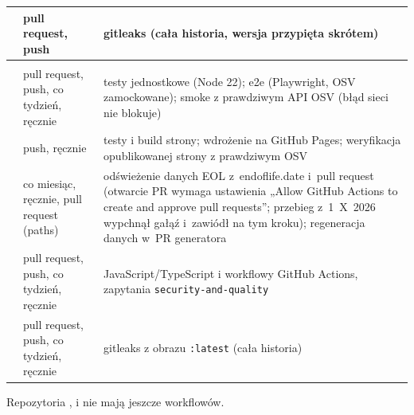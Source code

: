 \begin{xltabular}{\linewidth}{@{}>{\raggedright\arraybackslash}p{3.1cm} >{\raggedright\arraybackslash}p{4.1cm} >{\raggedright\arraybackslash}X@{}}
 & pull request, push & gitleaks (cała historia, wersja przypięta skrótem) \\
\midrule
{} \\
 & pull request, push, co tydzień, ręcznie & testy jednostkowe (Node 22); e2e (Playwright, OSV zamockowane); smoke z prawdziwym API OSV (błąd sieci nie blokuje) \\
 & push, ręcznie & testy i build strony; wdrożenie na GitHub Pages; weryfikacja opublikowanej strony z prawdziwym OSV \\
 & co miesiąc, ręcznie, pull request (paths) & odświeżenie danych EOL z~endoflife.date i~pull request (otwarcie PR wymaga ustawienia „Allow GitHub Actions to create and approve pull requests”; przebieg z~1~X~2026 wypchnął gałąź i~zawiódł na tym kroku); regeneracja danych w~PR generatora \\
 & pull request, push, co tydzień, ręcznie & JavaScript/TypeScript i workflowy GitHub Actions, zapytania \texttt{security-and-quality} \\
 & pull request, push, co tydzień, ręcznie & gitleaks z obrazu \texttt{:latest} (cała historia) \\
\bottomrule
\end{xltabular}

Repozytoria ,  i 
nie mają jeszcze workflowów.


